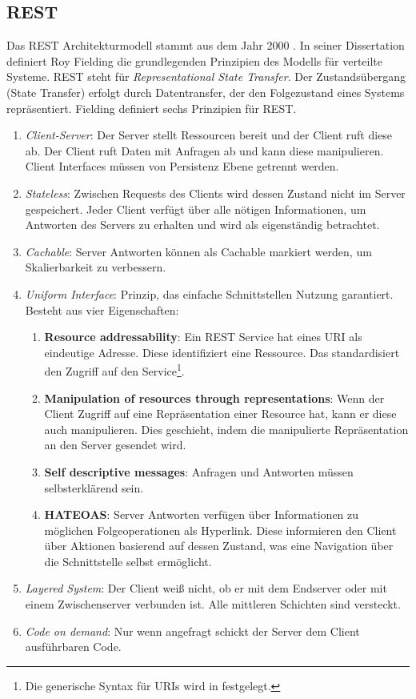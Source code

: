 \subsection{REST} \label{sec:rest}
Das REST Architekturmodell stammt aus dem Jahr 2000 \parencite{fielding_architectural_2000}. In seiner Dissertation definiert Roy Fielding die grundlegenden Prinzipien des Modells für verteilte Systeme. \acs{REST} steht für \textit{Representational State Transfer}. Der Zustandsübergang (State Transfer) erfolgt durch Datentransfer, der den Folgezustand eines Systems repräsentiert. Fielding definiert sechs Prinzipien für \acs{REST}.
\begin{enumerate}
  \item \textit{Client-Server}: Der Server stellt Ressourcen bereit und der Client ruft diese ab. Der Client ruft Daten mit Anfragen ab und kann diese manipulieren. Client Interfaces müssen von Persistenz Ebene getrennt werden.
  \item \textit{Stateless}: Zwischen Requests des Clients wird dessen Zustand nicht im Server gespeichert. Jeder Client verfügt über alle nötigen Informationen, um Antworten des Servers zu erhalten und wird als eigenständig betrachtet.
  \item \textit{Cachable}: Server Antworten können als Cachable markiert werden, um Skalierbarkeit zu verbessern.
  \item \textit{Uniform Interface}: Prinzip, das einfache Schnittstellen Nutzung garantiert. Besteht aus vier Eigenschaften:
        \begin{enumerate}
          \item \textbf{Resource addressability}: Ein \acs{REST} Service hat eines \acf{URI} als eindeutige Adresse. Diese identifiziert eine Ressource. Das standardisiert den Zugriff auf den Service\footnote{Die generische Syntax für \acs{URI}s wird in \parencite{berners-lee_uniform_2005} festgelegt.}.
          \item \textbf{Manipulation of resources through representations}: Wenn der Client Zugriff auf eine Repräsentation einer Resource hat, kann er diese auch manipulieren. Dies geschieht, indem die manipulierte Repräsentation an den Server gesendet wird.
          \item \textbf{Self descriptive messages}: Anfragen und Antworten müssen selbsterklärend sein.
          \item \textbf{\acf{HATEOAS}}: Server Antworten verfügen über Informationen zu möglichen Folgeoperationen als Hyperlink. Diese informieren den Client über Aktionen basierend auf dessen Zustand, was eine Navigation über die Schnittstelle selbst ermöglicht.
        \end{enumerate}
  \item \textit{Layered System}: Der Client weiß nicht, ob er mit dem Endserver oder mit einem Zwischenserver verbunden ist. Alle mittleren Schichten sind versteckt.
  \item \textit{Code on demand}: Nur wenn angefragt schickt der Server dem Client ausführbaren Code.
\end{enumerate}
